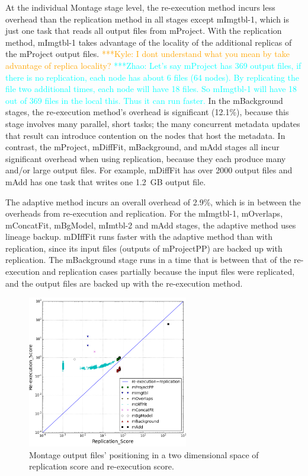 \documentclass{sig-alternate}
\newcommand{\zhaonote}[1]{{\textcolor{cyan}    { ***Zhao:      #1 }}}
\newcommand{\kylenote}[1]{{\textcolor{orange}    { ***Kyle:      #1 }}}
\newcommand{\zhaonote}[1]{}
\newcommand{\kylenote}[1]{}
\begin{document}
At the individual Montage stage level, the re-execution method incurs less overhead than the replication method in all stages except mImgtbl-1,
which is just one task that reads all output files from mProject.
With the replication method, mImgtbl-1 takes advantage of the locality of the additional replicas of the mProject output files.
\kylenote{I dont understand what you mean by take advantage of replica locality?}
\zhaonote{Let's say mProject has 369 output files, if there is no replication, each node has about 6 files (64 nodes). By replicating the file two additional times, each node will have 18 files. So mImgtbl-1 will have 18 out of 369 files in the local this. Thus it can run faster.}
In the mBackground stages, the re-execution method's overhead is significant (12.1\%), because this stage involves many
parallel, short tasks; the many concurrent metadata updates that result can introduce contention on the nodes that host the metadata.
In contrast, the mProject, mDiffFit, mBackground, and mAdd stages all incur significant overhead when using replication, because they each produce many and/or large output files.
For example, mDiffFit has over 2000 output files and mAdd has one task that writes one 1.2~GB output file.

The adaptive method incurs an overall overhead of 2.9\%, which is in between the overheads from re-execution and replication.
For the mImgtbl-1, mOverlaps, mConcatFit, mBgModel, mImtbl-2 and mAdd stages, the adaptive
method uses lineage backup.
mDIffFit runs faster with the adaptive method than with replication, since its input files (outputs of mProjectPP) are backed up with replication.
The mBackground stage runs in a time that is between that of the re-execution and replication cases partially because the input files
were replicated, and the output files are backed up with the re-execution method.


\begin{figure}[ht]
        \begin{center}
                \includegraphics[width=70mm]{pictures/dist}
                \vspace{-10pt}
                \caption{Montage output files' positioning in a two dimensional space of replication score and re-execution score.
                \label{fig:montage-space}}
        \end{center}
\end{figure}
\end{document}
